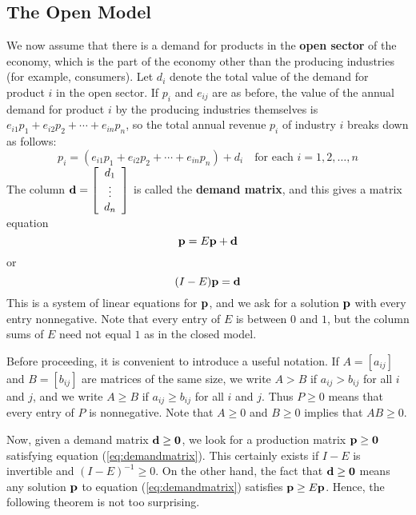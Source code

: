 \documentclass{ximera}
\begin{document}
\subsection*{The Open Model}

We now assume that there is a demand for products in the \textbf{open sector} of the economy, which is the part of the economy other than the producing industries (for example, consumers). Let $d_{i}$ denote the total value of the demand for product $i$ in the open sector. If $p_{i}$ and $e_{ij}$ are as before, the value of the annual demand for product $i$ by the producing industries themselves is $e_{i1}p_{1} + e_{i2}p_{2} + \cdots + e_{in}p_{n}$, so the total annual revenue $p_{i}$ of industry $i$ breaks down as follows:
\begin{equation*}
p_{i} = (e_{i1}p_{1} + e_{i2}p_{2} + \cdots + e_{in}p_{n}) + d_{i} \quad \mbox{for each } i = 1, 2, \dots, n
\end{equation*}
The column ${\bf d} = \left[ \begin{array}{c}
d_{1} \\
\vdots \\
d_{n}
\end{array} \right]$
 is called the \textbf{demand matrix}, and this gives a matrix equation
\begin{equation*}
{\bf p} = E{\bf p} + {\bf d}
\end{equation*}
or
\begin{equation}\label{eq:demandmatrix}
(I - E){\bf p} = {\bf d}
\end{equation}
This is a system of linear equations for ${\bf p}$, and we ask for a solution ${\bf p}$ with every entry nonnegative. Note that every entry of $E$ is between $0$ and $1$, but the column sums of $E$ need not equal $1$ as in the closed model.

Before proceeding, it is convenient to introduce a useful notation. If $A = \left[ a_{ij} \right]$ and $B = \left[ b_{ij} \right]$ are matrices of the same size, we write $A > B$ if $a_{ij} > b_{ij}$ for all $i$ and $j$, and we write $A \geq B$ if $a_{ij} \geq b_{ij}$ for all $i$ and $j$. Thus $P \geq 0$ means that every entry of $P$ is nonnegative. Note that $A \geq 0$ and $B \geq 0$ implies that $AB \geq 0$.

Now, given a demand matrix ${\bf d} \geq {\bf 0}$, we look for a production matrix ${\bf p} \geq {\bf 0}$ satisfying equation (\ref{eq:demandmatrix}). This certainly exists if $I - E$ is invertible and $(I - E)^{-1} \geq 0$. On the other hand, the fact that ${\bf d} \geq {\bf 0}$ means any solution ${\bf p}$ to equation (\ref{eq:demandmatrix}) satisfies ${\bf p} \geq E{\bf p}$. Hence, the following theorem is not too surprising.
\end{document}
